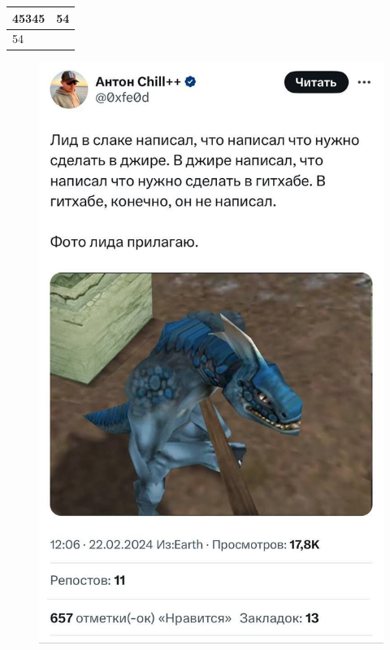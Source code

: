 \documentclass{article}
\begin{document}
 
\Large 
\begin{tabular}{|l|l|}
\hline 
45345 & 54\\
\hline 
54 & \\
\hline 
\end{tabular}
\begin{figure}[h] 
\includegraphics[scale=0.39421813403416556]{lead.png} 
\end{figure}
\end{document}
